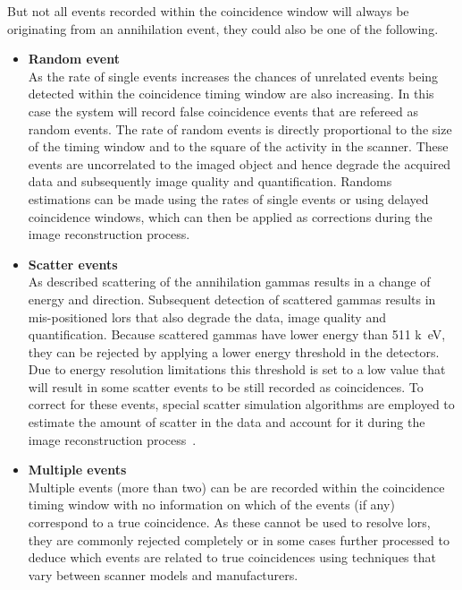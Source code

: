 %
But not all events recorded within the coincidence window will always be originating from an annihilation event, they could also be one of the following. 
%
\begin{itemize}

\item\textbf{Random event}\\
As the rate of single events increases the chances of unrelated events being detected within the coincidence timing window are also increasing. In this case the system will record false coincidence events that are refereed as random events. 
The rate of random events is directly proportional to the size of the timing window and to the square of the activity in the scanner. These events are uncorrelated to the imaged object and hence degrade the acquired data and subsequently image quality and quantification.  
Randoms estimations can be made using the rates of single events or using delayed coincidence windows, which can then be applied as corrections during the image reconstruction process. 

\item\textbf{Scatter events}\\
As described scattering of the annihilation gammas results in a change of energy and direction. Subsequent detection of scattered gammas results in mis-positioned \glspl{lor} that also degrade the data, image quality and quantification. 
Because scattered gammas have lower energy than 511 \si{k\electronvolt}, they can be rejected by applying a lower energy threshold in the detectors. Due to energy resolution limitations this threshold is set to a low value that will result in some scatter events to be still recorded as coincidences. 
To correct for these events, special scatter simulation algorithms are employed to estimate the amount of scatter in the data and account for it during the image reconstruction process~\cite{Polycarpou2011}. 

\item\textbf{Multiple events}\\
Multiple events (more than two) can be are recorded within the coincidence timing window with no information on which of the events (if any) correspond to a true coincidence. As these cannot be used to resolve \glspl{lor}, they are commonly rejected completely or in some cases further processed to deduce which events are related to true coincidences using techniques that vary between scanner models and manufacturers. 
\end{itemize}
%
